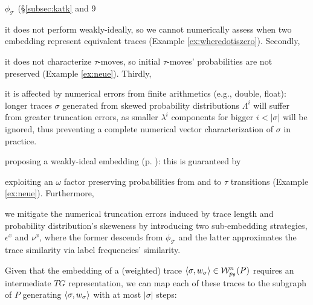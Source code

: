{ $\phi_{\mathcal{T}}$ (\S\ref{subsec:katk} and \cite{LodhiSSCW02,Raedt}9  \begin{alphalist} \item it does not perform weakly-ideally, so we cannot numerically assess when two embedding represent equivalent traces (Example \ref{ex:wheredotiszero}). Secondly, \item it does not characterize $\tau$-moves, so initial $\tau$-moves' probabilities are not preserved (Example \ref{ex:neue}). Thirdly, \item it is affected by numerical errors from finite arithmetics (e.g., double, float): longer traces $\sigma$ generated from skewed probability distributions $\Lambda^i$ will suffer from greater truncation errors, as smaller $\lambda^i$ components for bigger $i<|\sigma|$ will be ignored, thus preventing a complete numerical vector characterization of  $\sigma$ in practice.
\end{alphalist}

 \begin{alphalist}
	\item proposing a weakly-ideal embedding (p. \pageref{subsub:prop}):
	this is guaranteed by \item exploiting an $\omega$ factor preserving probabilities from and to $\tau$ transitions (Example \ref{ex:neue}). Furthermore, \item we mitigate the numerical truncation errors induced by trace length and probability distribution's skeweness by introducing two sub-embedding strategies, $\epsilon^x$ and $\nu^x$, where the former descends from $\phi_{\mathcal{T}}$ and the latter approximates the trace similarity via label frequencies' similarity. 
\end{alphalist}

Given that the embedding of a (weighted) trace $\braket{\sigma,w_\sigma}\in\mathcal{W}_{p_\theta}^n(P)$ requires an intermediate $TG$ representation, we can map each of these traces to the subgraph of $P$ generating $\braket{\sigma,w_\sigma}$ with at most $|\sigma|$ steps:}
